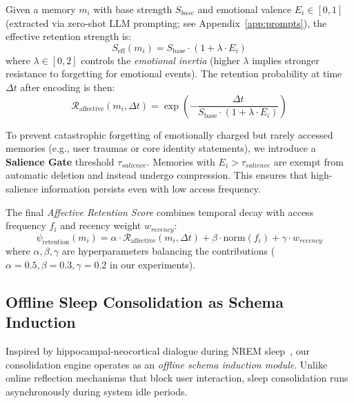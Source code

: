 Given a memory $m_i$ with base strength $S_{base}$ and emotional valence $E_i \in [0, 1]$ (extracted via zero-shot LLM prompting; see Appendix~\ref{app:prompts}), the effective retention strength is:
\begin{equation}
    S_{\text{eff}}(m_i) = S_{\text{base}} \cdot (1 + \lambda \cdot E_i)
\end{equation}
where $\lambda \in [0, 2]$ controls the \textit{emotional inertia} (higher $\lambda$ implies stronger resistance to forgetting for emotional events). The retention probability at time $\Delta t$ after encoding is then:
\begin{equation}
    \mathcal{R}_{\text{affective}}(m_i, \Delta t) = \exp\left(-\frac{\Delta t}{S_{\text{base}} \cdot (1 + \lambda \cdot E_i)}\right)
\end{equation}

To prevent catastrophic forgetting of emotionally charged but rarely accessed memories (e.g., user traumas or core identity statements), we introduce a \textbf{Salience Gate} threshold $\tau_{salience}$. Memories with $E_i > \tau_{salience}$ are exempt from automatic deletion and instead undergo compression. This ensures that high-salience information persists even with low access frequency.

The final \textit{Affective Retention Score} combines temporal decay with access frequency $f_i$ and recency weight $w_{recency}$:
\begin{equation}
    \psi_{\text{retention}}(m_i) = \alpha \cdot \mathcal{R}_{\text{affective}}(m_i, \Delta t) + \beta \cdot \text{norm}(f_i) + \gamma \cdot w_{recency}
\end{equation}
where $\alpha, \beta, \gamma$ are hyperparameters balancing the contributions ($\alpha=0.5, \beta=0.3, \gamma=0.2$ in our experiments).

\subsection{Offline Sleep Consolidation as Schema Induction}
\label{subsec:consolidation}

Inspired by hippocampal-neocortical dialogue during NREM sleep~\cite{mcclelland1995complementary}, our consolidation engine operates as an \textit{offline schema induction module}. Unlike online reflection mechanisms that block user interaction, sleep consolidation runs asynchronously during system idle periods.

